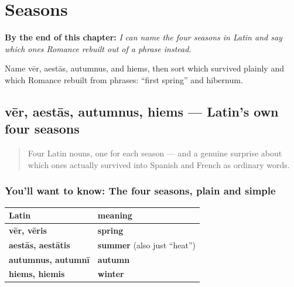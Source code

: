 
\chapter{Seasons}
\label{ch:la-seasons}

\begin{chapteropening}
\textbf{By the end of this chapter:} \emph{I can name the four seasons in Latin and say which ones Romance rebuilt out of a phrase instead.}

Name vēr, aestās, autumnus, and hiems, then sort which survived plainly and which Romance rebuilt from phrases: \textquotedblleft{}first spring\textquotedblright{} and hībernum.
\end{chapteropening}

\section[vēr, aestās, autumnus, hiems]{vēr, aestās, autumnus, hiems — Latin's own four seasons}

\label{lesson:LA-C09-anni-tempora}



\begin{quote}
Four Latin nouns, one for each season — and a genuine surprise about which ones actually survived into Spanish and French as ordinary words.
\end{quote}

\subsection*{You'll want to know: The four seasons, plain and simple}
\noindent
\begin{tabularx}{\linewidth}{@{}>{\raggedright\arraybackslash}X>{\raggedright\arraybackslash}X@{}}
\toprule
\textbf{Latin} & \textbf{meaning} \\
\midrule
\textbf{vēr, vēris} & \textbf{spring} \\
\textbf{aestās, aestātis} & \textbf{summer} (also just \textquotedblleft{}heat\textquotedblright{}) \\
\textbf{autumnus, autumnī} & \textbf{autumn} \\
\textbf{hiems, hiemis} & \textbf{winter} \\
\bottomrule
\end{tabularx}

